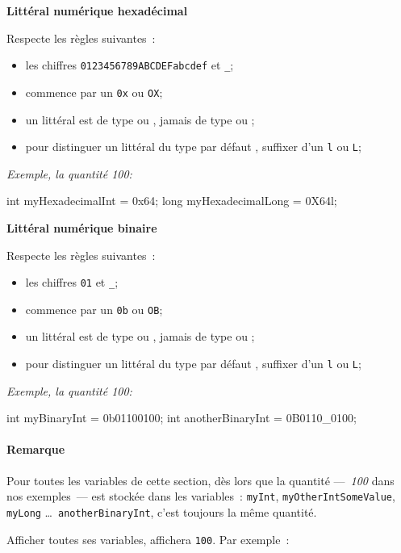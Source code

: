 \textbf{Littéral numérique hexadécimal}

Respecte les règles suivantes~:

\begin{itemize}
	\item les chiffres \texttt{0123456789ABCDEFabcdef} et \texttt{\_};
	\item commence par un \texttt{0x} ou \texttt{OX};
	\item un littéral est de type  ou , jamais de type 
		 ou ;
	\item pour distinguer un littéral  du type par défaut , suffixer 
		d'un \texttt{l} ou \texttt{L};
\end{itemize}

\textit{Exemple, la quantité 100: }
\begin{java}
	int myHexadecimalInt = 0x64;
	long myHexadecimalLong = 0X64l;
\end{java}

\clearpage
\textbf{Littéral numérique binaire}

Respecte les règles suivantes~:

\begin{itemize}
	\item les chiffres \texttt{01} et \texttt{\_};
	\item commence par un \texttt{0b} ou \texttt{OB};
	\item un littéral est de type  ou , jamais de type 
		 ou ;
	\item pour distinguer un littéral  du type par défaut , suffixer 
		d'un \texttt{l} ou \texttt{L};
\end{itemize}

\textit{Exemple, la quantité 100: } 
\begin{java}
	int myBinaryInt = 0b01100100;
	int anotherBinaryInt = 0B0110_0100;
\end{java}

\paragraph{Remarque} Pour toutes les variables de cette section, dès lors que
la quantité —~\textit{100} dans nos exemples~— est stockée dans les variables~:
\texttt{myInt}, \texttt{my\-Other\-Int\-Some\-Value}, \texttt{myLong} \dots\,
\texttt{anotherBinaryInt}, c'est toujours la même quantité. 

Afficher toutes ses variables, affichera \texttt{100}. Par exemple~:

